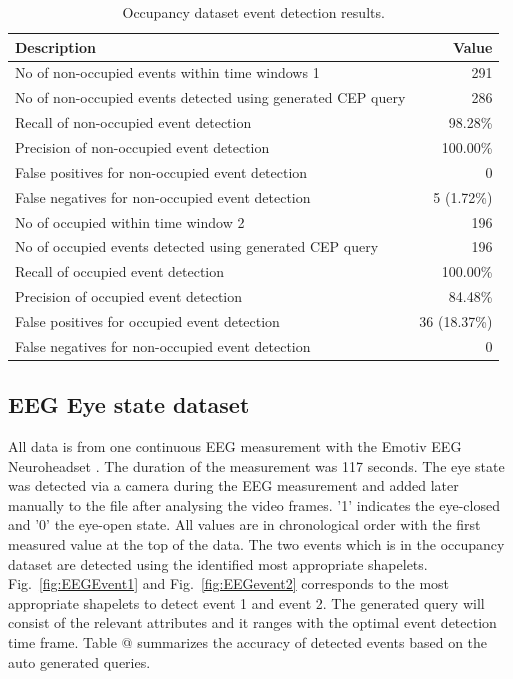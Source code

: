 \documentclass[conference]{IEEEtran}  %
\makeatletter
\newcommand*{\rom}[1]{\expandafter\@slowromancap\romannumeral #1@}
\makeatother
\begin{document}
\begin{table}
\begin{center}
\caption{Occupancy dataset event detection results.}
\begin{tabular}{ | m{6cm} | m{2.3cm}| } 
 \hline 
\textbf{Description} & \multicolumn{1}{|r|}{\textbf{Value}}\\
\hline
No of non-occupied events within time windows 1 & \multicolumn{1}{|r|}{291}\\
\hline
No of non-occupied events detected using generated CEP query & \multicolumn{1}{|r|}{286}\\
\hline
Recall of non-occupied event detection & \multicolumn{1}{|r|}{98.28\%}\\
\hline
Precision of non-occupied event detection & \multicolumn{1}{|r|}{100.00\%}\\
\hline
False positives for non-occupied event detection & \multicolumn{1}{|r|}{0}\\
\hline
False negatives for non-occupied event detection & \multicolumn{1}{|r|}{5 (1.72\%)}\\
\hline
No of occupied within time window 2 & \multicolumn{1}{|r|}{196} \\
\hline
No of occupied events detected using generated CEP query & \multicolumn{1}{|r|}{196}\\ 
 \hline
Recall of occupied event detection & \multicolumn{1}{|r|}{100.00\%}\\
\hline
Precision of occupied event detection & \multicolumn{1}{|r|}{84.48\%}\\
\hline
False positives for occupied event detection & \multicolumn{1}{|r|}{36 (18.37\%)}\\
\hline
False negatives for non-occupied event detection & \multicolumn{1}{|r|}{0}\\
\hline

\end{tabular}
\end{center}
\end{table}

\subsection{EEG Eye state dataset}
All data is from one continuous EEG measurement with the Emotiv EEG Neuroheadset \cite{IEEEexample:EEG}. The duration of the measurement was 117 seconds. The eye state was detected via a camera during the EEG measurement and added later manually to the file after analysing the video frames. '1' indicates the eye-closed and '0' the eye-open state. All values are in chronological order with the first measured value at the top of the data. The two events which is in the occupancy dataset are detected using the identified most appropriate shapelets. Fig.~\ref{fig:EEGEvent1} and Fig.~\ref{fig:EEGevent2} corresponds to the most appropriate shapelets to detect event 1 and event 2. The generated query will consist of the relevant attributes and it ranges with the optimal event detection time frame. Table \rom{2} summarizes the accuracy of detected events based on the auto generated queries.
\end{document}
